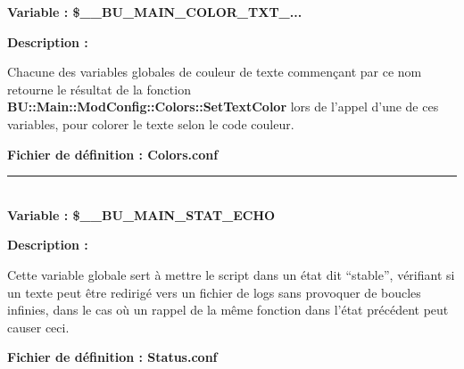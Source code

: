 \documentclass[a4paper,10pt]{article}
\begin{document}
\textbf{Variable : \color{vars}\$\_\_BU\_MAIN\_COLOR\_TXT\_...}\\[1\baselineskip]

\setlength{\parskip}{2em}

\begin{justify}
    \textbf{Description :}
\end{justify}

\setlength{\parskip}{1em}

\begin{justify}
    Chacune des variables globales de couleur de texte commençant par ce nom retourne le résultat de la fonction \textbf{\color{func}BU::Main::ModConfig::Colors::SetTextColor} lors de l'appel d'une de ces variables, pour colorer le texte selon le code couleur.
\end{justify}

\textbf{Fichier de définition : \color{path}Colors.conf}\\[1\baselineskip]




\color{vars}\par\noindent\rule{\textwidth}{0.4pt}\color{text}\\[1\baselineskip]

\textbf{Variable : \color{vars}\$\_\_BU\_MAIN\_STAT\_ECHO}\\[1\baselineskip]

\setlength{\parskip}{2em}

\begin{justify}
    \textbf{Description :}
\end{justify}

\setlength{\parskip}{1em}

\begin{justify}
    Cette variable globale sert à mettre le script dans un état dit ``stable'', vérifiant si un texte peut être redirigé vers un fichier de logs sans provoquer de boucles infinies, dans le cas où un rappel de la même fonction dans l'état précédent peut causer ceci.
\end{justify}

\textbf{Fichier de définition : \color{path}Status.conf}\\[1\baselineskip]


\end{document}
